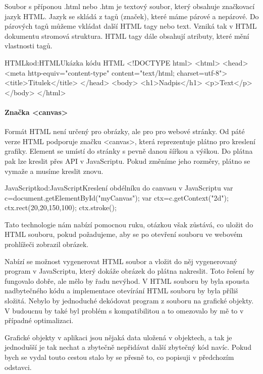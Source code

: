 \documentclass[
  field=inf,
  biblatex,
  glossaries,
  index
]{kidiplom}
\begin{document}
Soubor s příponou .html nebo .htm je textový soubor, který obsahuje značkovací jazyk HTML. Jazyk se skládá z tagů (značek), které máme párové a nepárové. Do párových tagů můžeme vkládat další HTML tagy nebo text. Vzniká tak v HTML dokumentu stromová struktura. HTML tagy dále obsahují atributy, které mění vlastnosti tagů.

\begin{kicode}{HTML}{kod:HTML}{Ukázka kódu HTML}
<!DOCTYPE html>
<html>
  <head>
  <meta http-equiv="content-type" content="text/html; charset=utf-8">
  <title>Titulek</title>
  </head>
  <body>
    <h1>Nadpis</h1>
    <p>Text</p>
  </body>
</html>
\end{kicode}

\paragraph{Značka <canvas>}

Formát HTML není určený pro obrázky, ale pro pro webové stránky. Od páté verze HTML podporuje značku <canvas>, která reprezentuje plátno pro kreslení grafiky. Element se umístí do stránky s pevně danou šířkou a výškou. Do plátna pak lze kreslit přes API v JavaScriptu. Pokud změníme jeho rozměry, plátno se vymaže a musíme kreslit znovu.

\begin{kicode}{JavaScript}{kod:JavaScript}{Kreslení obdélníku do canvasu v JavaScriptu}
var c=document.getElementById("myCanvas");
var ctx=c.getContext("2d");
ctx.rect(20,20,150,100);
ctx.stroke();
\end{kicode}

Tato technologie nám nabízí pomocnou ruku, otázkou však zůstává, co uložit do HTML souboru, pokud požadujeme, aby se po otevření souboru ve webovém prohlížeči zobrazil obrázek.

Nabízí se možnost vygenerovat HTML soubor a vložit do něj vygenerovaný program v JavaScriptu, který dokáže obrázek do plátna nakreslit. Toto řešení by fungovalo dobře, ale mělo by řadu nevýhod. V HTML souboru by byla spousta nadbytečného kódu a implementace otevírání HTML souboru by byla příliš složitá. Nebylo by jednoduché dekódovat program z souboru na grafické objekty. V budoucnu by také byl problém s kompatibilitou a to omezovalo by mě to v případné optimalizaci.

Grafické objekty v aplikaci jsou nějaká data uložená v objektech, a tak je jednodušší je tak nechat a zbytečně nepřidávat další zbytečný kód navíc. Pokud bych se vydal touto cestou stalo by se přesně to, co popisuji v předchozím odstavci.
\end{document}
